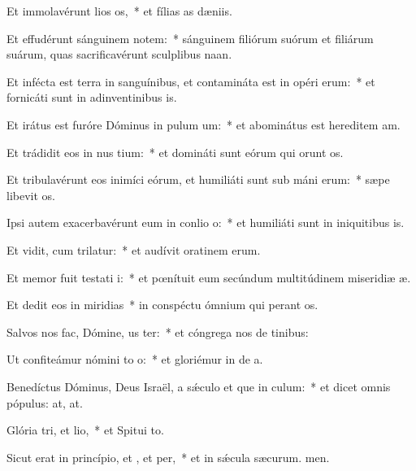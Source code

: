 \item Et immolavérunt lios os,~* et fílias as dæniis.
\item Et effudérunt sánguinem notem:~* sánguinem filiórum suórum et filiárum suárum, quas sacrificavérunt sculplibus naan.
\item Et infécta est terra in sanguínibus, et contamináta est in opéri erum:~* et fornicáti sunt in adinventinibus is.
\item Et irátus est furóre Dóminus in pulum um:~* et abominátus est hereditem am.
\item Et trádidit eos in nus tium:~* et domináti sunt eórum qui orunt os.
\item Et tribulavérunt eos inimíci eórum, et humiliáti sunt sub máni erum:~* sæpe libevit os.
\item Ipsi autem exacerbavérunt eum in conlio o:~* et humiliáti sunt in iniquitibus is.
\item Et vidit, cum trilatur:~* et audívit oratinem erum.
\item Et memor fuit testati i:~* et pœnítuit eum secúndum multitúdinem miseridiæ æ.
\item Et dedit eos in miridias~* in conspéctu ómnium qui perant os.
\item Salvos nos fac, Dómine, us ter:~* et cóngrega nos de tinibus:
\item Ut confiteámur nómini to o:~* et gloriémur in de a.
\item Benedíctus Dóminus, Deus Israël, a sǽculo et que in culum:~* et dicet omnis pópulus: at, at.
\item Glória tri, et lio,~* et Spitui to.
\item Sicut erat in princípio, et , et per,~* et in sǽcula sæcurum. men.
